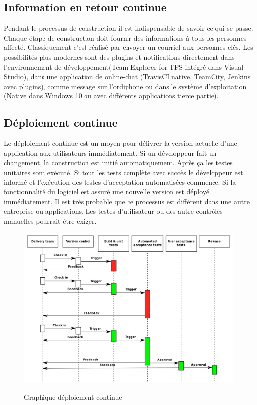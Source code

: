 \subsection{Information en retour continue}

Pendant le processus de construction il est indispensable de savoir ce qui se passe. Chaque étape de construction doit fournir des informations à tous les personnes affecté. Classiquement c'est réalisé par envoyer un courriel aux personnes clés. Les possibilités plus modernes sont des plugins et notifications directement dans l'environnement de développement(Team Explorer for TFS intégré dans Visual Studio), dans une application de online-chat (TravisCI native, TeamCity, Jenkins avec plugins), comme message sur l'ordiphone ou dans le système d'exploitation (Native dans Windows 10 ou avec différents applications tierce partie).

\newpage
\subsection{Déploiement continue}

Le déploiement continue est un moyen pour délivrer la version actuelle d'une application aux utilisateurs immédiatement. Si un développeur fait un changement, la construction est initié automatiquement. Après ça les testes unitaires sont exécuté. Si tout les tests complète avec succès  le développeur est informé et l'exécution des testes d'acceptation automatisées commence. Si la fonctionnalité du logiciel est assuré une nouvelle version est déployé immédiatement.
Il est très probable que ce processus est différent dans une autre entreprise ou applications. Les testes d'utilisateur ou des autre contrôles manuelles pourrait être exiger.\\
\begin{figure}[H]
\centering
\includegraphics[width=15cm]{bilder/Continuous_Delivery}
\caption{Graphique déploiement continue}\cite{wikicd}
\label{fig:continousdelivery}
\end{figure}

